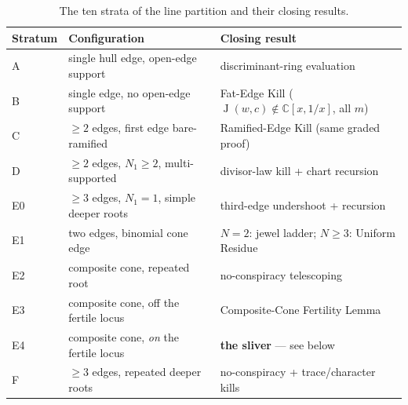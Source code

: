 \documentclass[11pt]{article}
\newcommand{\C}{\mathbb{C}}
\newcommand{\J}{\operatorname{J}}
\begin{document}
\begin{table}[ht]
\centering
\small
\begin{tabular}{@{}lll@{}}
\toprule
Stratum & Configuration & Closing result \\
\midrule
A & single hull edge, open-edge support & discriminant-ring evaluation \\
B & single edge, no open-edge support & Fat-Edge Kill ($\J(w,c) \notin \C[x,1/x]$, all $m$) \\
C & $\ge 2$ edges, first edge bare-ramified & Ramified-Edge Kill (same graded proof) \\
D & $\ge 2$ edges, $N_1 \ge 2$, multi-supported & divisor-law kill + chart recursion \\
E0 & $\ge 3$ edges, $N_1 = 1$, simple deeper roots & third-edge undershoot + recursion \\
E1 & two edges, binomial cone edge & $N=2$: jewel ladder; $N \ge 3$: Uniform Residue \\
E2 & composite cone, repeated root & no-conspiracy telescoping \\
E3 & composite cone, off the fertile locus & Composite-Cone Fertility Lemma \\
E4 & composite cone, \emph{on} the fertile locus & \textbf{the sliver} --- see below \\
F & $\ge 3$ edges, repeated deeper roots & no-conspiracy + trace/character kills \\
\bottomrule
\end{tabular}
\caption{The ten strata of the line partition and their closing results.}
\label{tab:strata}
\end{table}
\end{document}
